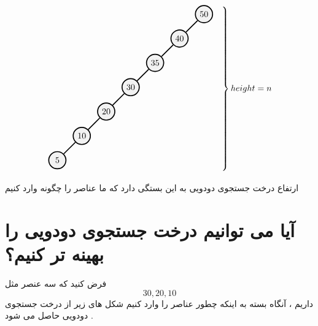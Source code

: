 \documentclass[12pt]{article}
\begin{document}
\begin{latin}
\begin{center}
$$
\begin{rcases}
\begin{tikzpicture}[very thick,level/.style={sibling distance=20mm,level distance = 10mm}]
\tikzstyle{vertex}=[draw,fill=black!5,circle,minimum size=20pt,inner sep=1pt]
\node [vertex] (r){$50$}
  child {
	    node [vertex] (a) {$40$}
	    child {
		      node [vertex] {$35$}
		       child {
			      node [vertex] {$30$}
			      child {
				      node [vertex] {$20$}
				      child {
					      node [vertex] {$10$}
					      child {
						      node [vertex] {$5$}
					    } child [missing] {}
				    } child [missing] {}
			    } child [missing] {}
		    } child [missing] {}
	    } child [missing] {}
  } child [missing] {};
\end{tikzpicture}
&
\end{rcases} 
height = n
$$
\end{center}
\end{latin}



\begin{tcolorbox}
ارتفاع درخت جستجوی دودویی به این بستگی دارد که ما عناصر را چگونه وارد کنیم
\end{tcolorbox}


\section{آیا می توانیم درخت جستجوی دودویی را بهینه تر کنیم؟}

فرض کنید که سه عنصر مثل
$$ 30, 20, 10 $$
داریم ، آنگاه بسته به اینکه چطور عناصر را وارد کنیم شکل های زیر از درخت جستجوی دودویی حاصل می شود .
\end{document}
